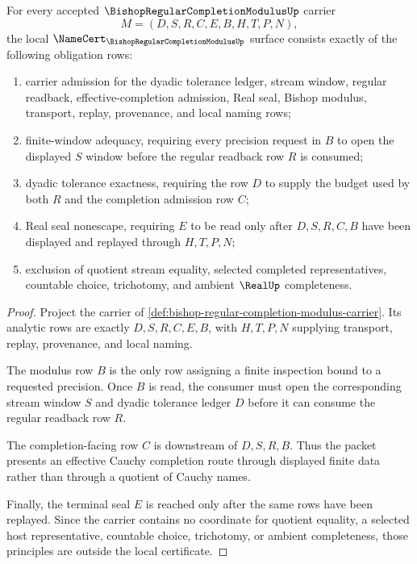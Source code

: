 \begin{theorem}
\label{thm:bishop-regular-completion-modulus-namecert-obligations}
For every accepted $\BishopRegularCompletionModulusUp$ carrier
$$
M=(D,S,R,C,E,B,H,T,P,N),
$$
the local $\NameCert_{\BishopRegularCompletionModulusUp}$ surface consists exactly of the following obligation rows:
\begin{enumerate}
\item carrier admission for the dyadic tolerance ledger, stream window, regular readback, effective-completion admission, Real seal, Bishop modulus, transport, replay, provenance, and local naming rows;
\item finite-window adequacy, requiring every precision request in $B$ to open the displayed $S$ window before the regular readback row $R$ is consumed;
\item dyadic tolerance exactness, requiring the row $D$ to supply the budget used by both $R$ and the completion admission row $C$;
\item Real seal nonescape, requiring $E$ to be read only after $D,S,R,C,B$ have been displayed and replayed through $H,T,P,N$;
\item exclusion of quotient stream equality, selected completed representatives, countable choice, trichotomy, and ambient $\RealUp$ completeness.
\end{enumerate}
\end{theorem}
\begin{proof}
Project the carrier of \autoref{def:bishop-regular-completion-modulus-carrier}. Its analytic rows are exactly $D,S,R,C,E,B$, with $H,T,P,N$ supplying transport, replay, provenance, and local naming.

The modulus row $B$ is the only row assigning a finite inspection bound to a requested precision. Once $B$ is read, the consumer must open the corresponding stream window $S$ and dyadic tolerance ledger $D$ before it can consume the regular readback row $R$.

The completion-facing row $C$ is downstream of $D,S,R,B$. Thus the packet presents an effective Cauchy completion route through displayed finite data rather than through a quotient of Cauchy names.

Finally, the terminal seal $E$ is reached only after the same rows have been replayed. Since the carrier contains no coordinate for quotient equality, a selected host representative, countable choice, trichotomy, or ambient completeness, those principles are outside the local certificate.
\end{proof}

